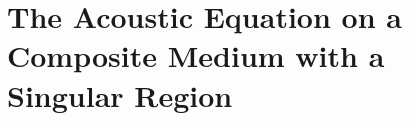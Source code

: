 \chapter{The Acoustic Equation on a Composite Medium with a Singular Region} \label{ch:SingInc}











%





\begin{subappendices}





\end{subappendices}